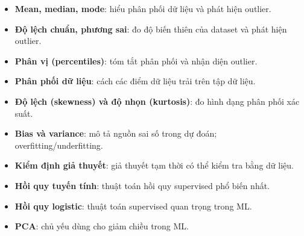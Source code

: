 \begin{phuongphap}[title={Các khái niệm thống kê quan trọng trong ML}]
\begin{itemize}
  \item \textbf{Mean, median, mode}: hiểu phân phối dữ liệu và phát hiện outlier.
  \item \textbf{Độ lệch chuẩn, phương sai}: đo độ biến thiên của dataset và phát hiện outlier.
  \item \textbf{Phân vị (percentiles)}: tóm tắt phân phối và nhận diện outlier.
  \item \textbf{Phân phối dữ liệu}: cách các điểm dữ liệu trải trên tập dữ liệu.
  \item \textbf{Độ lệch (skewness) và độ nhọn (kurtosis)}: đo hình dạng phân phối xác suất.
  \item \textbf{Bias và variance}: mô tả nguồn sai số trong dự đoán; overfitting/underfitting.
  \item \textbf{Kiểm định giả thuyết}: giả thuyết tạm thời có thể kiểm tra bằng dữ liệu.
  \item \textbf{Hồi quy tuyến tính}: thuật toán hồi quy supervised phổ biến nhất.
  \item \textbf{Hồi quy logistic}: thuật toán supervised quan trọng trong ML.
  \item \textbf{PCA}: chủ yếu dùng cho giảm chiều trong ML.
\end{itemize}
\end{phuongphap}

